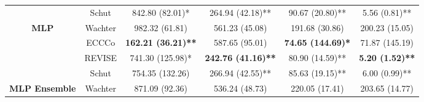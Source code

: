 \begin{table}
{\begin{tabular}[t]{>{}cccccc}
 & Schut & 842.80 (82.01)* & 264.94 (42.18)** & 90.67 (20.80)** & 5.56 (0.81)**\\

\multirow{-4}{*}{\centering\arraybackslash \textbf{MLP}} & Wachter & 982.32 (61.81) & 561.23 (45.08) & 191.68 (30.86) & 200.23 (15.05)\\
\cmidrule{1-6}
 & ECCCo & \textbf{162.21 (36.21)**} & 587.65 (95.01) & \textbf{74.65 (144.69)*} & 71.87 (145.19)\\

 & REVISE & 741.30 (125.98)* & \textbf{242.76 (41.16)**} & 80.90 (14.59)** & \textbf{5.20 (1.52)**}\\

 & Schut & 754.35 (132.26) & 266.94 (42.55)** & 85.63 (19.15)** & 6.00 (0.99)**\\

\multirow{-4}{*}{\centering\arraybackslash \textbf{MLP Ensemble}} & Wachter & 871.09 (92.36) & 536.24 (48.73) & 220.05 (17.41) & 203.65 (14.77)\\
\bottomrule
\end{tabular}}
\end{table}
